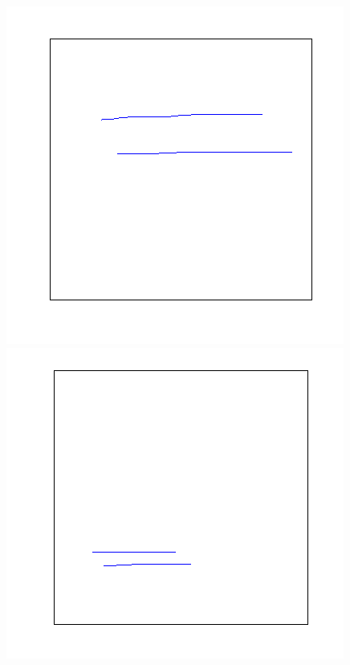 \documentclass[a4paper, 10pt]{article}
\begin{document}
\begin{figure}[ht]
\begin{minipage}[b]{0.45\linewidth}
\centering
\includegraphics[width=\textwidth]{figs/=-1}
\caption{}
\label{fig:figure1}
\end{minipage}
\hspace{0.5cm}
\begin{minipage}[b]{0.45\linewidth}
\centering
\includegraphics[width=\textwidth]{figs/=-2}
\caption{}
\label{fig:figure2}
\end{minipage}
\end{figure}
\end{document}
